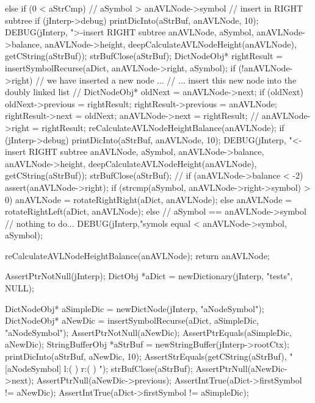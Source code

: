 {{  } else if (0 < aStrCmp) {
    // aSymbol > anAVLNode->symbol // insert in RIGHT subtree
    if (jInterp->debug) {
      printDicInto(aStrBuf, anAVLNode, 10);
      DEBUG(jInterp, ">-insert RIGHT subtree %
          anAVLNode, aSymbol, anAVLNode->balance,
          anAVLNode->height, deepCalculateAVLNodeHeight(anAVLNode),
          getCString(aStrBuf));
      strBufClose(aStrBuf);
    }
    DictNodeObj* rightResult =
      insertSymbolRecurse(aDict, anAVLNode->right, aSymbol);
    if (!anAVLNode->right) {
      // we have inserted a new node ...
      // ... insert this new node into the doubly linked list
      //
      DictNodeObj* oldNext           = anAVLNode->next;
      if (oldNext) oldNext->previous = rightResult;
      rightResult->previous          = anAVLNode;
      rightResult->next              = oldNext;
      anAVLNode->next                = rightResult;
      //
    }
    anAVLNode->right = rightResult;
    reCalculateAVLNodeHeightBalance(anAVLNode);
    if (jInterp->debug) {
      printDicInto(aStrBuf, anAVLNode, 10);
      DEBUG(jInterp, "<-insert RIGHT subtree %
          anAVLNode, aSymbol, anAVLNode->balance,
          anAVLNode->height, deepCalculateAVLNodeHeight(anAVLNode),
          getCString(aStrBuf));
      strBufClose(aStrBuf);
    }
    //
    if (anAVLNode->balance < -2) {
      assert(anAVLNode->right);
      if (strcmp(aSymbol, anAVLNode->right->symbol) > 0) {
        anAVLNode = rotateRightRight(aDict, anAVLNode);
      } else {
        anAVLNode = rotateRightLeft(aDict, anAVLNode);
      }
    }
  } else {
    // aSymbol == anAVLNode->symbol // nothing to do...
    DEBUG(jInterp,"symols equal <%
          anAVLNode->symbol, aSymbol);
  }

  reCalculateAVLNodeHeightBalance(anAVLNode);
  return anAVLNode;
}
\stopCCode

\startCTest
  AssertPtrNotNull(jInterp);
  DictObj *aDict = newDictionary(jInterp, "tests", NULL);
  
  DictNodeObj* aSimpleDic = newDictNode(jInterp, "aNodeSymbol");
  DictNodeObj* aNewDic = insertSymbolRecurse(aDict, aSimpleDic, "aNodeSymbol");
  AssertPtrNotNull(aNewDic);
  AssertPtrEquals(aSimpleDic, aNewDic);
  StringBufferObj *aStrBuf = newStringBuffer(jInterp->rootCtx);
  printDicInto(aStrBuf, aNewDic, 10);
  AssertStrEquals(getCString(aStrBuf),
  "[aNodeSymbol] l:(  ) r:(  ) ");
  strBufClose(aStrBuf);
  AssertPtrNull(aNewDic->next);
  AssertPtrNull(aNewDic->previous);
  AssertIntTrue(aDict->firstSymbol != aNewDic);
  AssertIntTrue(aDict->firstSymbol != aSimpleDic);
\stopCTest
\stopTestCase

